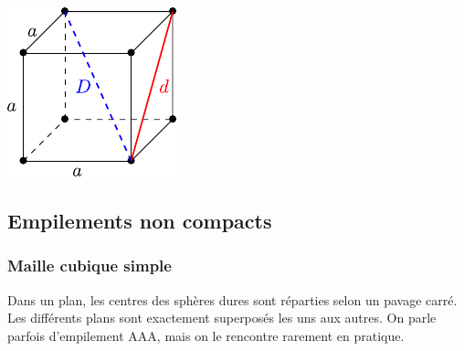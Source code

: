 \documentclass[../../main/main.tex]{subfiles}
\begin{document}
\begin{tcb*}[sidebyside, righthand ratio=.3]
\begin{center}
{		}{
			\includegraphics[width=\linewidth]{rapp_cube}
		}
		\vspace{-15pt}
	\end{center}
\end{tcb*}

\subsection{Empilements non compacts}
\subsubsection{Maille cubique simple}

Dans un plan, les centres des sphères dures sont réparties selon un pavage
carré. Les différents plans sont exactement superposés les uns aux
autres. On parle parfois d'empilement AAA, mais on le rencontre rarement en
pratique.
\end{document}
